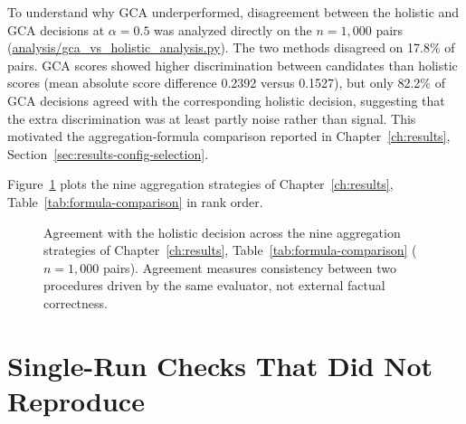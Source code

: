 To understand why GCA underperformed, disagreement between the holistic and GCA
decisions at $\alpha = 0.5$ was analyzed directly on the $n=1{,}000$ pairs
(\url{analysis/gca_vs_holistic_analysis.py}). The two methods disagreed on
17.8\% of pairs. GCA scores showed higher discrimination between candidates than
holistic scores (mean absolute score difference 0.2392 versus 0.1527), but only
82.2\% of GCA decisions agreed with the corresponding holistic decision, suggesting
that the extra discrimination was at least partly noise rather than signal. This
motivated the aggregation-formula comparison reported in
Chapter~\ref{ch:results}, Section~\ref{sec:results-config-selection}.

Figure~\ref{fig:formula-agreement} plots the nine aggregation strategies of
Chapter~\ref{ch:results}, Table~\ref{tab:formula-comparison} in rank order.

\begin{figure}[htbp]
\centering
{}
\caption[Agreement across the nine aggregation strategies]{Agreement with the holistic decision across the nine aggregation
strategies of Chapter~\ref{ch:results}, Table~\ref{tab:formula-comparison}
($n=1{,}000$ pairs). Agreement measures consistency between two procedures
driven by the same evaluator, not external factual correctness.}
\label{fig:formula-agreement}
\end{figure}

\section{Single-Run Checks That Did Not Reproduce}
\label{sec:results-alpha0-validation}

